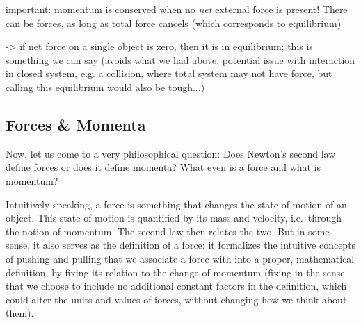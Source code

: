 \documentclass[../class_mech_main.tex]{subfiles}
\begin{document}
important: momentum is conserved when no \emph{net} external force is present! There can be forces, as long as total force cancels (which corresponds to equilibrium)

-> if net force on a single object is zero, then it is in equilibrium; this is something we can say (avoids what we had above, potential issue with interaction in closed system, e.g. a collision, where total system may not have force, but calling this equilibrium would also be tough...)



        \subsection{Forces \& Momenta}



Now, let us come to a very philosophical question: Does Newton's second law define forces or does it define momenta? What even is a force and what is momentum?

Intuitively speaking, a force is something that changes the state of motion of an object. This state of motion is quantified by its mass and velocity, i.e.~through the notion of momentum. The second law then relates the two. But in some sense, it also serves as the definition of a force: it formalizes the intuitive concepts of pushing and pulling that we associate a force with into a proper, mathematical definition, by fixing its relation to the change of momentum (fixing in the sense that we choose to include no additional constant factors in the definition, which could alter the units and values of forces, without changing how we think about them).
\end{document}
